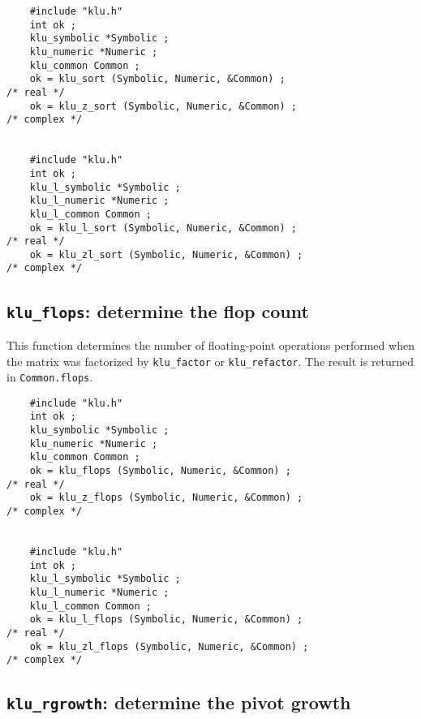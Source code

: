 \documentclass[11pt]{article}
\begin{document}
{\footnotesize
\begin{verbatim}
    #include "klu.h"
    int ok ;
    klu_symbolic *Symbolic ;
    klu_numeric *Numeric ;
    klu_common Common ;
    ok = klu_sort (Symbolic, Numeric, &Common) ;                                      /* real */
    ok = klu_z_sort (Symbolic, Numeric, &Common) ;                                    /* complex */


    #include "klu.h"
    int ok ;
    klu_l_symbolic *Symbolic ;
    klu_l_numeric *Numeric ;
    klu_l_common Common ;
    ok = klu_l_sort (Symbolic, Numeric, &Common) ;                                    /* real */
    ok = klu_zl_sort (Symbolic, Numeric, &Common) ;                                   /* complex */
\end{verbatim}
}

\subsection{{\tt klu\_flops}: determine the flop count}

This function determines the number of floating-point operations performed
when the matrix was factorized by {\tt klu\_factor} or {\tt klu\_refactor}.
The result is returned in {\tt Common.flops}.


{\footnotesize
\begin{verbatim}
    #include "klu.h"
    int ok ;
    klu_symbolic *Symbolic ;
    klu_numeric *Numeric ;
    klu_common Common ;
    ok = klu_flops (Symbolic, Numeric, &Common) ;                                     /* real */
    ok = klu_z_flops (Symbolic, Numeric, &Common) ;                                   /* complex */


    #include "klu.h"
    int ok ;
    klu_l_symbolic *Symbolic ;
    klu_l_numeric *Numeric ;
    klu_l_common Common ;
    ok = klu_l_flops (Symbolic, Numeric, &Common) ;                                   /* real */
    ok = klu_zl_flops (Symbolic, Numeric, &Common) ;                                  /* complex */
\end{verbatim}
}

\subsection{{\tt klu\_rgrowth}: determine the pivot growth}
\end{document}
